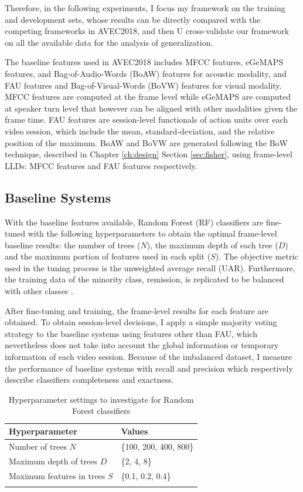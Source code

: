 Therefore, in the following experiments, I focus my framework on the training and development sets, whose results can be directly compared with the competing frameworks \cite{yang2018, du2018, xing2018, syed2018} in AVEC2018, and then U cross-validate our framework on all the available data for the analysis of generalization.

The baseline features used in AVEC2018 includes MFCC features, eGeMAPS features, and Bag-of-Audio-Words (BoAW) features for acoustic modality, and FAU features and Bag-of-Visual-Words (BoVW) features for visual modality. MFCC features are computed at the frame level while eGeMAPS are computed at speaker turn level that however can be aligned with other modalities given the frame time. FAU features are session-level functionals of action units over each video session, which include the mean, standard-deviation, and the relative position of the maximum. BoAW and BoVW are generated following the BoW technique, described in Chapter \ref{ch:design} Section \ref{sec:fisher}, using frame-level LLDs: MFCC features and FAU features respectively. 


\subsection{Baseline Systems}

With the baseline features available, Random Forest (RF) classifiers are fine-tuned with the following hyperparameters to obtain the optimal frame-level baseline results: the number of trees ($N$), the maximum depth of each tree ($D$) and the maximum portion of features used in each split ($S$). The objective metric used in the tuning process is the unweighted average recall (UAR). Furthermore, the training data of the minority class, remission, is replicated to be balanced with other classes \cite{ringeval2018}.

After fine-tuning and training, the frame-level results for each feature are obtained. To obtain session-level decisions, I apply a simple majority voting strategy to the baseline systems using features other than FAU, which nevertheless does not take into account the global information or temporary information of each video session.  Because of the imbalanced dataset, I measure the performance of baseline systems with recall and precision which respectively describe classifiers completeness and exactness.

\begin{table}[htb]
    \small
    \centering
    \caption{Hyperparameter settings to investigate for Random Forest classifiers}
    \begin{tabular}{l|l}
    \Xhline{2\arrayrulewidth}
        Hyperparameter & Values \\
        \hline
        Number of trees $N$ & \{100, 200, 400, 800\} \\
        Maximum depth of trees $D$ & \{2, 4, 8\} \\
        Maximum features in trees $S$ & \{0.1, 0.2, 0.4\} \\
    \Xhline{2\arrayrulewidth}
    \end{tabular}
    \label{tab:params_rf}
\end{table}



